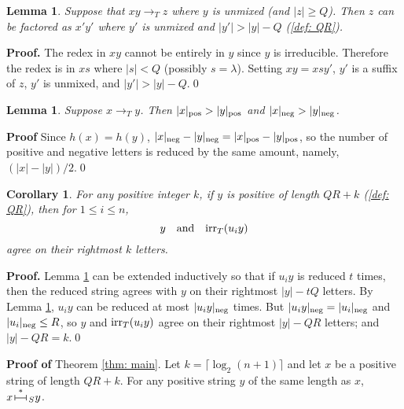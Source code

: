 \documentclass[12pt,a4paper]{article}
\newtheorem{lemma}[theorem]{Lemma}
\newtheorem{corollary}[theorem]{Corollary}
\newcommand{\irr}{{\text{\rm irr}}}
\newcommand{\pres}{\,
{\vrule height5pt width.5pt depth0pt
\overset{\vrule height.5pt width10pt depth0pt}
{\vrule height0pt width0pt depth0pt}
\vrule height5pt width.5pt depth0pt}\,}
\newcommand{\presstar}{{\overset{*}{\pres}}}
\numberwithin{equation}{section}
\newcommand{\pos}{{\text{\rm pos}}}
\renewcommand{\neg}{{\text{\rm neg}}}
\newcommand{\be}{\begin{equation*}}
\newcommand{\ee}{\end{equation*}}
\newcommand{\hb}{\hfil\break}
\begin{document}
\begin{lemma}
\label{lem: reduced by Q}
Suppose that $xy \to_T z$ where $y$ is unmixed (and $|z| \geq Q$).
Then $z$ can be factored as $x'y'$ where $y'$ is  unmixed and $|y'| > |y| - Q$
(\ref{def: QR}).
\end{lemma}

{\bf Proof.} The redex in $xy$ cannot be entirely in
$y$ since $y$ is irreducible.  Therefore the redex
is in $x s$ where $|s| < Q$ (possibly $s =\lambda$).
Setting $xy = xsy'$, $y'$ is a suffix of $z$,
$y'$ is unmixed, and $|y'| > |y| - Q$.\qed

\begin{lemma}
\label{lem: balanced reduction}
Suppose $x \to_T y$. Then $|x|_\pos > |y|_\pos$
and $|x|_\neg  > |y|_\neg$.
\end{lemma}

{\bf Proof}
Since $h(x)=h(y)$, $|x|_\neg-|y|_\neg = |x|_\pos-|y|_\pos$,
so the number of positive and negative letters is reduced
by the same amount, namely, $(|x|-|y|)/2$.\qed

\begin{corollary}
\label{cor: rightmost k}
For any positive integer $k$, if $y$ is positive
of  length $QR+k$ (\ref{def: QR}), then
for $1 \leq i \leq n$,
\be
y\quad\text{\rm and}\quad \irr_T(u_i y)
\ee
agree on their rightmost $k$ letters.
\end{corollary}

{\bf Proof.}
Lemma \ref{lem: reduced by Q} can be extended inductively
so that if $u_i y$ is reduced $t$ times, then
the reduced string agrees with $y$ on their rightmost
$|y|- tQ$ letters.  By Lemma \ref{lem: balanced reduction},
$u_i y$ can be reduced at most $|u_iy|_\neg$ times.
But $|u_iy|_\neg = |u_i|_\neg$ and $|u_i|_\neg \leq R$,
so $y$ and $\irr_T(u_i y)$ agree on their rightmost
$|y|-QR$ letters; and $|y|-QR=k$.\qed

\hb

{\bf Proof of} Theorem \ref{thm: main}.
Let $k=\lceil \log_2 (n+1) \rceil$ and let $x$ be a positive
string of length $QR + k$.  For any positive string
$y$ of the same length as $x$, $x {\presstar}_S y$.
\end{document}
